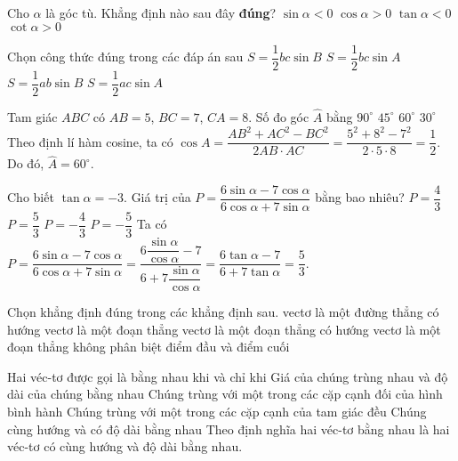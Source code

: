 \begin{ex}%
Cho $\alpha$ là góc tù. Khẳng định nào sau đây \textbf{đúng}?
\choice
{$\sin \alpha<0$}
{$\cos \alpha>0$}
{\True $\tan \alpha<0$}
{$\cot \alpha>0$}
\end{ex}

\begin{ex}%
Chọn công thức đúng trong các đáp án sau
\choice
{$S=\dfrac{1}{2}bc\sin B$}
{\True $S=\dfrac{1}{2}bc\sin A$}
{$S=\dfrac{1}{2}ab\sin B$}
{$S=\dfrac{1}{2}ac\sin A$}
\end{ex}

\begin{ex}%
Tam giác $ ABC$ có $ AB=5$, $BC=7$, $CA=8$. Số đo góc $ \widehat{A}$ bằng
\choice
{$ 90^\circ $}
{$ 45^\circ $}
{\True $ 60^\circ $}
{$ 30^\circ $}
\loigiai
{Theo định lí hàm cosine, ta có $ \cos{A}=\dfrac{AB^2+AC^2-BC^2}{2AB\cdot AC}=\dfrac{5^2+8^2-7^2}{2\cdot 5\cdot 8}=\dfrac{1}{2}$.\\
Do đó, $ \widehat{A}=60^\circ $.}
\end{ex}

\begin{ex}%
Cho biết $\tan \alpha =-3$. Giá trị của $P=\dfrac{6\sin \alpha -7\cos \alpha }{6\cos \alpha +7\sin \alpha }$ bằng bao nhiêu?
\choice
{$P=\dfrac{4}{3}$}
{\True $P=\dfrac{5}{3}$}
{$P=-\dfrac{4}{3}$}
{$P=-\dfrac{5}{3}$}
\loigiai
{Ta có $P=\dfrac{6\sin \alpha -7\cos \alpha }{6\cos \alpha +7\sin \alpha }=\dfrac{6\dfrac{\sin \alpha }{\cos \alpha }-7}{6+7\dfrac{\sin \alpha }{\cos \alpha }}=\dfrac{6\tan \alpha -7}{6+7\tan \alpha }=\dfrac{5}{3}$.}
\end{ex}

\begin{ex}%
Chọn khẳng định đúng trong các khẳng định sau.
\choice
{vectơ là một đường thẳng có hướng}
{vectơ là một đoạn thẳng}
{\True vectơ là một đoạn thẳng có hướng}
{vectơ là một đoạn thẳng không phân biệt điểm đầu và điểm cuối}
\end{ex}

\begin{ex}%
Hai véc-tơ được gọi là bằng nhau khi và chỉ khi
\choice
{Giá của chúng trùng nhau và độ dài của chúng bằng nhau}
{Chúng trùng với một trong các cặp cạnh đối của hình bình hành}
{Chúng trùng với một trong các cặp cạnh của tam giác đều}
{\True Chúng cùng hướng và có độ dài bằng nhau}
\loigiai
{Theo định nghĩa hai véc-tơ bằng nhau là hai véc-tơ có cùng hướng và độ dài bằng nhau.}
\end{ex}

